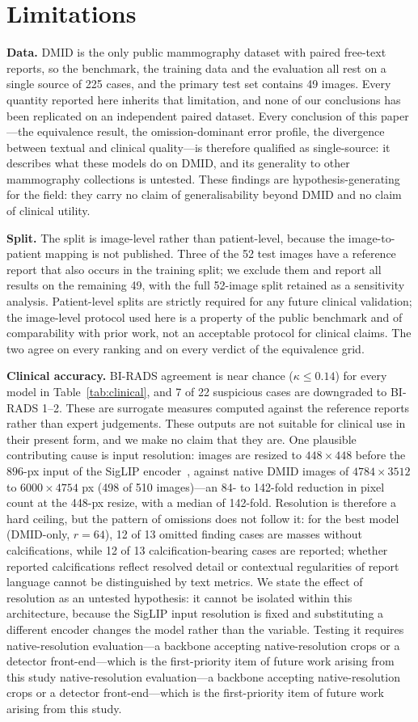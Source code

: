 \documentclass{wlscirep}
\newif\ifmarkup
\newif\ifmarkbar
\newcommand{\rev}[1]{%
  \ifmarkup
    \ifmarkbar\cbstart#1\cbend\else\textcolor{revised}{#1}\fi
  \else#1\fi}
\begin{document}
%
\section*{Limitations}

\textbf{Data.} DMID is the only public mammography dataset with paired free-text reports, so the benchmark, the training data and the evaluation all rest on a single source of 225 cases, and the primary test set contains 49 images. Every quantity reported here inherits that limitation, and none of our conclusions has been replicated on an independent paired dataset. Every conclusion of this paper---the equivalence result, the omission-dominant error profile, the divergence between textual and clinical quality---is therefore qualified as single-source: it describes what these models do on DMID, and its generality to other mammography collections is untested. These findings are hypothesis-generating for the field: they carry no claim of generalisability beyond DMID and no claim of clinical utility.

\textbf{Split.} The split is image-level rather than patient-level, because the image-to-patient mapping is not published. Three of the 52 test images have a reference report that also occurs in the training split; we exclude them and report all results on the remaining 49, with the full 52-image split retained as a sensitivity analysis. Patient-level splits are strictly required for any future clinical validation; the image-level protocol used here is a property of the public benchmark and of comparability with prior work, not an acceptable protocol for clinical claims. The two agree on every ranking and on every verdict of the equivalence grid.

\textbf{Clinical accuracy.} BI-RADS agreement is near chance ($\kappa \leq 0.14$) for every model in Table~\ref{tab:clinical}, and 7 of 22 suspicious cases are downgraded to BI-RADS 1--2. These are surrogate measures computed against the reference reports rather than expert judgements. These outputs are not suitable for clinical use in their present form, and we make no claim that they are. One plausible contributing cause is input resolution: images are resized to $448\times448$ before the $896$-px input of the SigLIP encoder~\cite{zoph2020siglip}, against native DMID images of $4784\times3512$ to $6000\times4754$ px (498 of 510 images)---an 84- to 142-fold reduction in pixel count at the 448-px resize, with a median of 142-fold. Resolution is therefore a hard ceiling, but the pattern of omissions does not follow it: for the best model (DMID-only, $r=64$), 12 of 13 omitted finding cases are masses without calcifications, while 12 of 13 calcification-bearing cases are reported; whether reported calcifications reflect resolved detail or contextual regularities of report language cannot be distinguished by text metrics. We state the effect of resolution as an untested hypothesis: it cannot be isolated within this architecture, because the SigLIP input resolution is fixed and substituting a different encoder changes the model rather than the variable. Testing it requires \rev{native-resolution evaluation---a backbone accepting native-resolution crops or a detector front-end---which is the first-priority item of future work arising from this study}.
\end{document}
